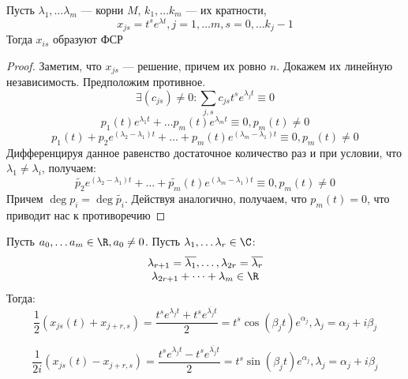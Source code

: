 \begin{theorem}
    Пусть \(\lambda_1, \dots \lambda_m\) --- корни \(M\), \(k_1, \dots k_m\) --- их кратности, 
    \[x_{js} = t^se^{\lambda t}, j = 1, \dots m, s = 0, \dots k_j - 1\]
    Тогда \(x_{is}\) образуют ФСР
\end{theorem}
\begin{proof}
    Заметим, что \(x_{js}\) --- решение, причем их ровно \(n\). Докажем их линейную независимость. Предположим противное.
    \[\exists (c_{js}) \ne 0: \sum_{j, s} c_{js}t^se^{\lambda_j t} \equiv 0\]
    \[p_1(t)e^{\lambda_1 t} + \dots p_m(t)e^{\lambda_m t} \equiv 0, p_m(t) \ne 0\]
    \[p_1(t) + p_2e^{(\lambda_2 - \lambda_1)t} + \dots + p_m(t)e^{(\lambda_m - \lambda_1)t} \equiv 0, p_m(t) \ne 0\]
    Дифференцируя данное равенство достаточное количество раз и при условии, что \(\lambda_1 \ne \lambda_i\), получаем:
    \[\tilde{p_2}e^{(\lambda_2 - \lambda_1)t} + \dots + \tilde{p_m}(t)e^{(\lambda_m - \lambda_1)t} \equiv 0, p_m(t) \ne 0\]
    Причем \(\deg p_i = \deg \tilde{p_i}\). 
    Действуя аналогично, получаем, что \(p_m(t) = 0\), что приводит нас к противоречию
\end{proof}

Пусть \(a_0, \dots a_m \in \R, a_0 \ne 0\). Пусть \(\lambda_1, \dots \lambda_r \in \C\):
\[\begin{array}{c}
    \lambda_{r + 1} = \overline{\lambda_1}, \dots, \lambda_{2r} = \overline{\lambda_r} \\
    \lambda_{2r + 1} + \dots + \lambda_m \in \R
\end{array}\]
Тогда:
\[\frac{1}{2}\left( x_{js}(t) + x_{j + r, s} \right) = \frac{t^se^{\lambda_j t} + t^s e^{\overline{\lambda_j}t}}{2} = t^s \cos (\beta_j t)e^{\alpha_j}, \lambda_j = \alpha_j + i\beta_j\]

\[\frac{1}{2i}\left( x_{js}(t) - x_{j + r, s} \right) = \frac{t^se^{\lambda_j t} - t^s e^{\overline{\lambda_j}t}}{2} = t^s \sin (\beta_j t)e^{\alpha_j}, \lambda_j = \alpha_j + i\beta_j\]

